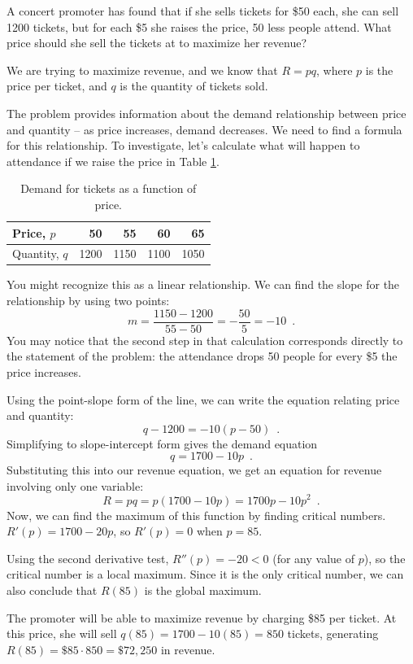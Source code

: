 \begin{example}
A concert promoter has found that if she sells tickets for \$50 each, she can sell 1200 tickets, but for each \$5 she raises the price, 50 less people attend. What price should she sell the tickets at to maximize her revenue?

\begin{solution} We are trying to maximize revenue, and we know that $R=pq$, where $p$ is the price per ticket, and $q$ is the quantity of tickets sold.

The problem provides information about the demand relationship between price and quantity -- as price increases, demand decreases. We need to find a formula for this relationship. To investigate, let's calculate what will happen to attendance if we raise the price in Table \ref{tab:3-6-tickets}.

\begin{table}[ht!]
    \centering
    \begin{tabular}{l*{4}{r}}
    \toprule
    Price, $p$    &	50    &	55    &	60    &	65 \\
    \midrule
    Quantity, $q$	& 1200  &	1150  &	1100  &	1050\\
    \bottomrule
    \end{tabular}
    \caption{Demand for tickets as a function of price.}
    \label{tab:3-6-tickets}
\end{table}
You might recognize this as a linear relationship. We can find the slope for the relationship by using two points:
$$m = \frac{1150-1200}{55-50}=-\frac{50}{5}=-10 \enspace .$$
You may notice that the second step in that calculation corresponds directly to the statement of the problem: the attendance drops 50 people for every \$5 the price increases.

Using the point-slope form of the line, we can write the equation relating price and quantity:
$$q-1200=-10(p-50) \enspace .$$
Simplifying to slope-intercept form gives the demand equation
$$q=1700-10p \enspace .$$
Substituting this into our revenue equation, we get an equation for revenue involving only one variable:
$$R=pq=p(1700-10p)=1700p-10p^2 \enspace .$$
Now, we can find the maximum of this function by finding critical numbers. $R'(p)=1700-20p$, so $R'(p)=0$ when $p=85$.

Using the second derivative test, $R''(p)=-20<0$ (for any value of $p$), so the critical number is a local maximum. Since it is the only critical number, we can also conclude that $R(85)$ is the global maximum.

The promoter will be able to maximize revenue by charging \$85 per ticket. At this price, she will sell $q(85)=1700-10(85)=850$ tickets, generating $R(85) = \$85\cdot850 = \$72,250$ in revenue.
\end{solution}\end{example}

